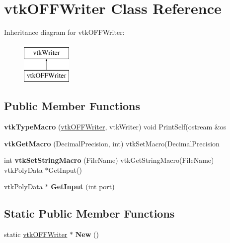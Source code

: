 \hypertarget{classvtk_o_f_f_writer}{}\section{vtk\+O\+F\+F\+Writer Class Reference}
\label{classvtk_o_f_f_writer}
Inheritance diagram for vtk\+O\+F\+F\+Writer\+:\begin{figure}[H]
\begin{center}
\leavevmode
\includegraphics[height=2.000000cm]{classvtk_o_f_f_writer}
\end{center}
\end{figure}
\subsection*{Public Member Functions}
\begin{DoxyCompactItemize}
\item 
\hypertarget{classvtk_o_f_f_writer_a9618ece038b10d27fd617a415c2fddcf}{}{\bfseries vtk\+Type\+Macro} (\hyperlink{classvtk_o_f_f_writer}{vtk\+O\+F\+F\+Writer}, vtk\+Writer) void Print\+Self(ostream \&os\label{classvtk_o_f_f_writer_a9618ece038b10d27fd617a415c2fddcf}

\item 
\hypertarget{classvtk_o_f_f_writer_a488141311b3afa34d57d0f4121045918}{}{\bfseries vtk\+Get\+Macro} (Decimal\+Precision, int) vtk\+Set\+Macro(Decimal\+Precision\label{classvtk_o_f_f_writer_a488141311b3afa34d57d0f4121045918}

\item 
\hypertarget{classvtk_o_f_f_writer_afa41af7eaf9c9139169f5469ce335246}{}int {\bfseries vtk\+Set\+String\+Macro} (File\+Name) vtk\+Get\+String\+Macro(File\+Name) vtk\+Poly\+Data $\ast$Get\+Input()\label{classvtk_o_f_f_writer_afa41af7eaf9c9139169f5469ce335246}

\item 
\hypertarget{classvtk_o_f_f_writer_a2f0eaa36ab22686b00d71e8d82ad8712}{}vtk\+Poly\+Data $\ast$ {\bfseries Get\+Input} (int port)\label{classvtk_o_f_f_writer_a2f0eaa36ab22686b00d71e8d82ad8712}

\end{DoxyCompactItemize}
\subsection*{Static Public Member Functions}
\begin{DoxyCompactItemize}
\item 
\hypertarget{classvtk_o_f_f_writer_a95fbd3cdd0fcb755963c6691dfe078f2}{}static \hyperlink{classvtk_o_f_f_writer}{vtk\+O\+F\+F\+Writer} $\ast$ {\bfseries New} ()\label{classvtk_o_f_f_writer_a95fbd3cdd0fcb755963c6691dfe078f2}

\end{DoxyCompactItemize}
